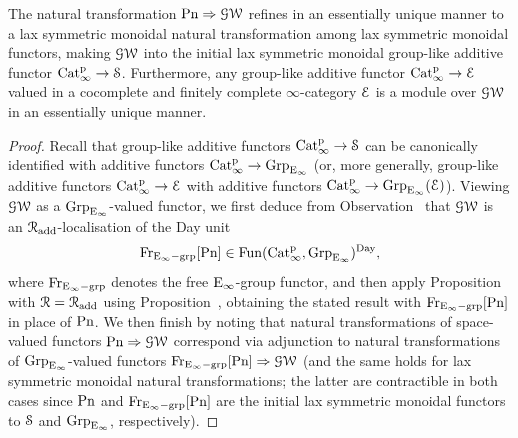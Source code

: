 \begin{corollary}
\label{corollary:GWspace-universal-multiplicative}%
The natural transformation $\mathrm{Pn} \Rightarrow \operatorname{\mathcal{GW}}$
refines in an essentially unique manner to a lax symmetric monoidal natural transformation among lax symmetric monoidal functors, making $\operatorname{\mathcal{GW}}$ into the initial lax symmetric monoidal group-like additive functor $\mathrm{Cat}^{\mathrm p}_\infty \to \mathcal S$.
Furthermore, any group-like additive functor $\mathrm{Cat}^{\mathrm p}_\infty \to \mathcal{E}$ valued in a %
cocomplete and finitely complete $\infty$-category $\mathcal{E}$ is a module over $\operatorname{\mathcal{GW}}$ in an essentially unique manner.
\end{corollary}
\begin{proof}
Recall that group-like additive functors $\mathrm{Cat}^{\mathrm p}_\infty \to \mathcal S$ can be canonically identified with additive functors $\mathrm{Cat}^{\mathrm p}_\infty \to \operatorname{Grp}_{{\mathrm{E}_{\infty}}}$ (or, more generally, group-like additive functors $\mathrm{Cat}^{\mathrm p}_\infty \to \mathcal{E}$ with additive functors $\mathrm{Cat}^{\mathrm p}_\infty \to \operatorname{Grp}_{{\mathrm{E}_{\infty}}}(\mathcal{E})$). Viewing $\operatorname{\mathcal{GW}}$ as a $\operatorname{Grp}_{{\mathrm{E}_{\infty}}}$-valued functor, 
we first deduce from Observation~ that $\operatorname{\mathcal{GW}}$ is an $\mathcal{R}_{\mathrm{add}}$-localisation of the Day unit 
\[
\mathrm{Fr}_{{\mathrm{E}_{\infty}}-\mathrm{grp}}[\mathrm{Pn}] \in \operatorname{Fun}(\mathrm{Cat}^{\mathrm p}_\infty,\operatorname{Grp}_{{\mathrm{E}_{\infty}}})^{\mathrm{Day}} ,
\]
where $\mathrm{Fr}_{{\mathrm{E}_{\infty}}-\mathrm{grp}}$ denotes the free ${\mathrm{E}_{\infty}}$-group functor, and then apply Proposition~
with $\mathcal{R} = \mathcal{R}_{\mathrm{add}}$ using Proposition~, obtaining the stated result with $\mathrm{Fr}_{{\mathrm{E}_{\infty}}-\mathrm{grp}}[\mathrm{Pn}]$ in place of $\mathrm{Pn}$. We then finish by noting that natural transformations of space-valued functors $\mathrm{Pn} \Rightarrow \operatorname{\mathcal{GW}}$ correspond via adjunction to natural transformations of $\operatorname{Grp}_{{\mathrm{E}_{\infty}}}$-valued functors $\mathrm{Fr}_{{\mathrm{E}_{\infty}}-\mathrm{grp}}[\mathrm{Pn}] \Rightarrow \operatorname{\mathcal{GW}}$ (and the same holds for lax symmetric monoidal natural transformations; the latter are contractible in both cases since $\mathrm{Pn}$ and $\mathrm{Fr}_{{\mathrm{E}_{\infty}}-\mathrm{grp}}[\mathrm{Pn}]$ are the initial lax symmetric monoidal functors to $\mathcal S$ and $\operatorname{Grp}_{{\mathrm{E}_{\infty}}}$, respectively).
\end{proof}



